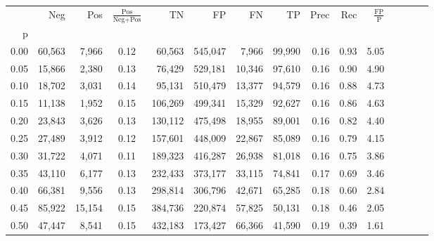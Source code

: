 \begin{tabular}{rrrcrrrrrrrrrrr}
\toprule
{} &     Neg &     Pos & $\frac{\text{Pos}}{\text{Neg}+\text{Pos}}$ &       TN &       FP &       FN &      TP &  Prec &   Rec & $\frac{\text{FP}}{\text{P}}$ \\
p    &         &         &                                            &          &          &          &         &       &       &                              \\
\midrule
0.00 &  60,563 &   7,966 &                                       0.12 &   60,563 &  545,047 &    7,966 &  99,990 &  0.16 &  0.93 &                         5.05 \\
0.05 &  15,866 &   2,380 &                                       0.13 &   76,429 &  529,181 &   10,346 &  97,610 &  0.16 &  0.90 &                         4.90 \\
0.10 &  18,702 &   3,031 &                                       0.14 &   95,131 &  510,479 &   13,377 &  94,579 &  0.16 &  0.88 &                         4.73 \\
0.15 &  11,138 &   1,952 &                                       0.15 &  106,269 &  499,341 &   15,329 &  92,627 &  0.16 &  0.86 &                         4.63 \\
0.20 &  23,843 &   3,626 &                                       0.13 &  130,112 &  475,498 &   18,955 &  89,001 &  0.16 &  0.82 &                         4.40 \\
0.25 &  27,489 &   3,912 &                                       0.12 &  157,601 &  448,009 &   22,867 &  85,089 &  0.16 &  0.79 &                         4.15 \\
0.30 &  31,722 &   4,071 &                                       0.11 &  189,323 &  416,287 &   26,938 &  81,018 &  0.16 &  0.75 &                         3.86 \\
0.35 &  43,110 &   6,177 &                                       0.13 &  232,433 &  373,177 &   33,115 &  74,841 &  0.17 &  0.69 &                         3.46 \\
0.40 &  66,381 &   9,556 &                                       0.13 &  298,814 &  306,796 &   42,671 &  65,285 &  0.18 &  0.60 &                         2.84 \\
0.45 &  85,922 &  15,154 &                                       0.15 &  384,736 &  220,874 &   57,825 &  50,131 &  0.18 &  0.46 &                         2.05 \\
0.50 &  47,447 &   8,541 &                                       0.15 &  432,183 &  173,427 &   66,366 &  41,590 &  0.19 &  0.39 &                         1.61 \\

\end{tabular}
